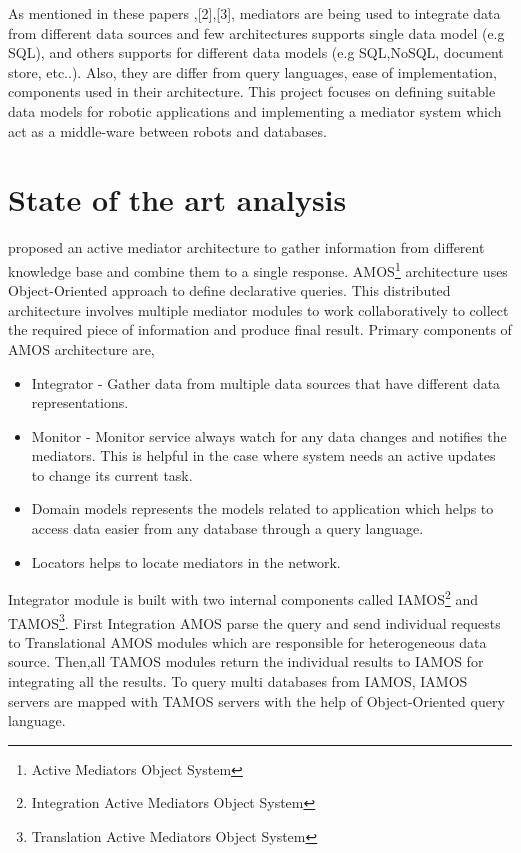\documentclass[12pt]{article}
\begin{document}
As mentioned in these papers \cite{fahl1993amos},[2],[3], mediators are being used to integrate data from different data sources and few architectures supports single data model (e.g SQL), and others supports for different data models (e.g SQL,NoSQL, document store, etc..). Also, they are differ from query languages, ease of implementation, components used in their architecture. This project focuses on defining suitable data models for robotic applications and implementing a mediator system which act as a middle-ware between robots and databases. 

\section{State of the art analysis}

\citet{fahl1993amos} proposed an active mediator architecture to gather information from different knowledge base and combine them to a single response. AMOS\footnote{\label{amos}Active Mediators Object System} architecture uses Object-Oriented approach to define declarative queries. This distributed architecture involves multiple mediator modules to work collaboratively to collect the required piece of information and produce final result. Primary components of AMOS architecture are,
\begin{itemize}
	\item Integrator - Gather data from multiple data sources that have different data representations.
	\item Monitor - Monitor service always watch for any data changes and notifies the mediators. This is helpful in the case where system needs an active updates to change its current task.
	\item Domain models represents the models related to application which helps to access data easier from any database through a query language.
	\item Locators helps to locate mediators in the network.
\end{itemize}


Integrator module is built with two internal components called IAMOS\footnote{\label{amos}Integration Active Mediators Object System} and TAMOS\footnote{\label{amos}Translation Active Mediators Object System}. 
First Integration AMOS parse the query and send individual requests to Translational AMOS modules which are responsible for heterogeneous data source.
Then,all TAMOS modules return the individual results to IAMOS for integrating all the results. To query multi databases from IAMOS, IAMOS servers are mapped with TAMOS servers with the help of Object-Oriented query language.
\end{document}
